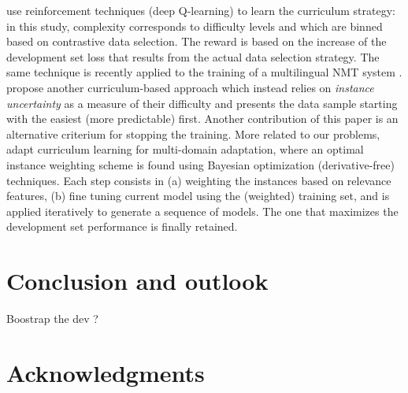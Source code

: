 \documentclass[11pt,a4paper]{article}
\newcommand{\fyTodo}[1]{\Todo[FY:]{\textcolor{orange}{#1}}}
\begin{document}
\citet{Kumar19reinforcement} use reinforcement techniques (deep Q-learning) to learn the curriculum strategy: in this study, complexity corresponds to difficulty levels and which are binned based on contrastive data selection. The reward is based on the increase of the development set loss that results from the actual data selection strategy.\fyTodo{Alert: what do we do during warm up ?} The same technique is recently applied to the training of a multilingual NMT system \cite{Kumar21learning}. \citet{Zhou20uncertainty} propose another curriculum-based approach which instead relies on \emph{instance uncertainty} as a measure of their difficulty and presents the data sample starting with the easiest (more predictable) first. Another contribution of this paper is an alternative criterium for stopping the training. More related to our problems, \citet{Wang20learning-multi} adapt curriculum learning for multi-domain adaptation, where an optimal instance weighting scheme is found using Bayesian optimization (derivative-free) techniques. Each step consists in (a) weighting the instances based on relevance features, (b) fine tuning current model using the (weighted) training set, and is applied iteratively to generate a sequence of models. The one that maximizes the development set performance is finally retained.


\section{Conclusion and outlook \label{sec:discussion}}
\fyTodo{Are we learning the dev set ?} Boostrap the dev ?

\section*{Acknowledgments}


\end{document}
